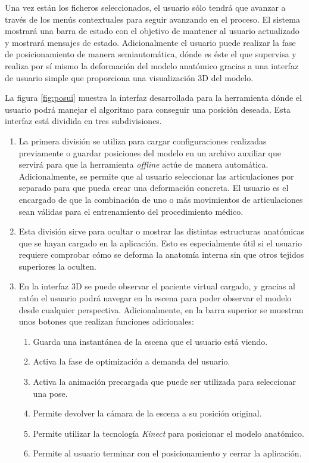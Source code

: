 Una vez están los ficheros seleccionados, el usuario sólo tendrá que avanzar a través de los menús contextuales para seguir avanzando en el proceso. El sistema mostrará una barra de estado con el objetivo de mantener al usuario actualizado y mostrará mensajes de estado. Adicionalmente el usuario puede realizar la fase de posicionamiento de manera semiautomática, dónde es éste el que supervisa y realiza por sí mismo la deformación del modelo anatómico gracias a una interfaz de usuario simple que proporciona una visualización 3D del modelo.

La figura \ref{fig:posui} muestra la interfaz desarrollada para la herramienta dónde el usuario podrá manejar el algoritmo para conseguir una posición deseada. Esta interfaz está dividida en tres subdivisiones. 
\begin{enumerate}
    \item La primera división se utiliza para cargar configuraciones realizadas previamente o guardar posiciones del modelo en un archivo auxiliar que servirá para que la herramienta \emph{offline} actúe de manera automática. Adicionalmente, se permite que al usuario seleccionar las articulaciones por separado para que pueda crear una deformación concreta. El usuario es el encargado de que la combinación de uno o más movimientos de articulaciones sean válidas para el entrenamiento del procedimiento médico. 
    \item Esta división sirve para ocultar o mostrar las distintas estructuras anatómicas que se hayan cargado en la aplicación. Esto es especialmente útil si el usuario requiere comprobar cómo se deforma la anatomía interna sin que otros tejidos superiores la oculten.
    \item En la interfaz 3D se puede observar el paciente virtual cargado, y gracias al ratón el usuario podrá navegar en la escena para poder observar el modelo desde cualquier perspectiva. Adicionalmente, en la barra superior se muestran unos botones que realizan funciones adicionales:
    \begin{enumerate}
   \item Guarda una instantánea de la escena que el usuario está viendo. 
   \item Activa la fase de optimización a demanda del usuario. 
   \item Activa la animación precargada que puede ser utilizada para seleccionar una pose. 
   \item Permite devolver la cámara de la escena a su posición original. 
   \item Permite utilizar la tecnología \emph{Kinect}  para posicionar el modelo anatómico.
   \item   Permite al usuario terminar con el posicionamiento y cerrar la aplicación.
    \end{enumerate}
    
\end{enumerate}


